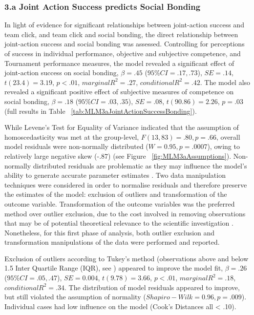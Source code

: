 \documentclass[12pt]{report}
\begin{document}
{\subsubsection{3.a Joint Action Success predicts Social Bonding}

In light of evidence for significant relationships between joint-action success and team click, and team click and social bonding, the direct relationship between joint-action success and social bonding was assessed. Controlling for perceptions of success in individual performance, objective and subjective competence, and Tournament performance measures, the model revealed a significant effect of joint-action success on social bonding, $\beta = .45$ ($95\% CI =  .17, .73$), $SE = .14$, $t(23.4) = 3.19$, $p < .01$, $marginal R^2 = .27$, $conditional R^2 = .42$.  The model also revealed a significant positive effect of subjective measures of competence on social bonding, $\beta = .18$ ($95\% CI =  .03, .35$), $SE = .08$, $t(90.86) = 2.26$, $p = .03$ (full results in Table ~\ref{tab:MLM3aJointActionSuccessBonding}).

While Levene's Test for Equality of Variance indicated that the assumption of homoscedasticity was met at the group-level, $F(13,83) = .80, p = .66$, overall model residuals were non-normally distributed ($W = 0.95, p = .0007$), owing to relatively large negative skew (-.87) (see Figure ~\ref{fig:MLM3aAssumptions}). Non-normally distributed residuals are problematic as they may influence the model's ability to generate accurate parameter estimates . Two data manipulation techniques were considered in order to normalise residuals and therefore preserve the estimates of the model: exclusion of outliers and transformation of the outcome variable.  Transformation of the outcome variables was the preferred method over outlier exclusion, due to the cost involved in removing observations that may be of potential theoretical relevance to the scientific investigation \citep{Rousseeuw2011}. Nonetheless, for this first phase of analysis, both outlier exclusion and transformation manipulations of the data were performed and reported.

Exclusion of outliers according to Tukey's method (observations above and below 1.5 \times Inter Quartile Range (IQR), see \citep{Tukey1977}) appeared to improve the model fit, $\beta = .26$ ($95\% CI =  .05, .47$), $SE = 0.004$, $t(9.78) = 3.66$, $p < .01$, $marginal R^2 = .18$, $conditional R^2 = .34$.  The distribution of model residuals appeared to improve, but still violated the assumption of normality ($Shapiro-Wilk = 0.96, p = .009$).  Individual cases had low influence on the model (Cook's Distances all < .10).

}
\end{document}
